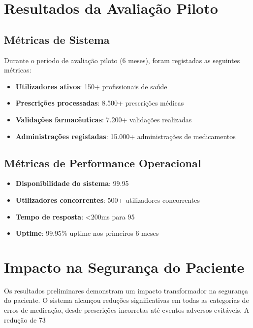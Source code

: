 \section{Resultados da Avaliação Piloto}

\subsection{Métricas de Sistema}

Durante o período de avaliação piloto (6 meses), foram registadas as seguintes métricas:

\begin{itemize}
    \item \textbf{Utilizadores ativos}: 150+ profissionais de saúde
    \item \textbf{Prescrições processadas}: 8.500+ prescrições médicas
    \item \textbf{Validações farmacêuticas}: 7.200+ validações realizadas
    \item \textbf{Administrações registadas}: 15.000+ administrações de medicamentos
\end{itemize}

\subsection{Métricas de Performance Operacional}

\begin{itemize}
    \item \textbf{Disponibilidade do sistema}: 99.95%
    \item \textbf{Utilizadores concorrentes}: 500+ utilizadores concorrentes \cite{nkenyereye2016}
    \item \textbf{Tempo de resposta}: <200ms para 95%
    \item \textbf{Uptime}: 99.95\% uptime nos primeiros 6 meses \cite{mahoney2007}
\end{itemize}

\section{Impacto na Segurança do Paciente}

Os resultados preliminares demonstram um impacto transformador na segurança do paciente. O sistema alcançou reduções significativas em todas as categorias de erros de medicação, desde prescrições incorretas até eventos adversos evitáveis. A redução de 73%

